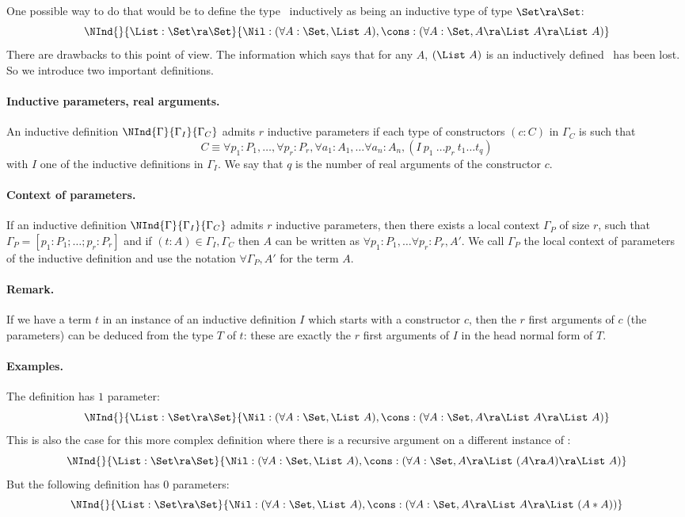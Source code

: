One possible way to do that would be to define the type \List\
inductively as being an inductive type of type $\Set\ra\Set$:
\[\NInd{}{\List:\Set\ra\Set}{\Nil:(\forall A:\Set,\List~A),
  \cons : (\forall A:\Set, A \ra \List~A \ra \List~A)}\]
There are drawbacks to this point of view. The
information which says that for any $A$, $(\List~A)$ is an inductively defined
\Set\ has been lost.
So we introduce two important definitions.

\paragraph{Inductive parameters, real arguments.}
An inductive definition $\NInd{\Gamma}{\Gamma_I}{\Gamma_C}$ admits 
$r$ inductive parameters if each type of constructors $(c:C)$ in
$\Gamma_C$ is such that 
\[C\equiv \forall
p_1:P_1,\ldots,\forall p_r:P_r,\forall a_1:A_1, \ldots \forall a_n:A_n,
(I~p_1~\ldots p_r~t_1\ldots t_q)\]
with $I$ one of the inductive definitions in $\Gamma_I$. 
We say that $q$ is the number of real arguments of the constructor
$c$. 
\paragraph{Context of parameters.}
If an inductive definition $\NInd{\Gamma}{\Gamma_I}{\Gamma_C}$ admits 
$r$ inductive parameters, then there exists a local context $\Gamma_P$ of
size $r$, such that $\Gamma_P=[p_1:P_1;\ldots;p_r:P_r]$ and 
if $(t:A) \in \Gamma_I,\Gamma_C$ then $A$ can be written as 
$\forall p_1:P_1,\ldots \forall p_r:P_r,A'$. 
We call $\Gamma_P$ the local context of parameters of the inductive
definition and use the notation $\forall \Gamma_P,A'$ for the term $A$.
\paragraph{Remark.}
If we have a term $t$ in an instance of an
inductive definition $I$ which starts with a constructor $c$, then the
$r$ first arguments of $c$ (the parameters) can be deduced from the
type $T$ of $t$: these are exactly the $r$ first arguments of $I$ in
the head normal form of $T$.
\paragraph{Examples.}
The \List{} definition has $1$ parameter:
\[\NInd{}{\List:\Set\ra\Set}{\Nil:(\forall A:\Set, \List~A),
  \cons : (\forall A:\Set, A \ra \List~A \ra \List~A)}\]
This is also the case for this more complex definition where there is
a recursive argument on a different instance of \List: 
\[\NInd{}{\List:\Set\ra\Set}{\Nil:(\forall A:\Set, \List~A),
  \cons : (\forall A:\Set, A \ra \List~(A \ra A) \ra \List~A)}\]
But the following definition has $0$ parameters:
\[\NInd{}{\List:\Set\ra\Set}{\Nil:(\forall A:\Set, \List~A),
  \cons : (\forall A:\Set, A \ra \List~A \ra \List~(A*A))}\]

